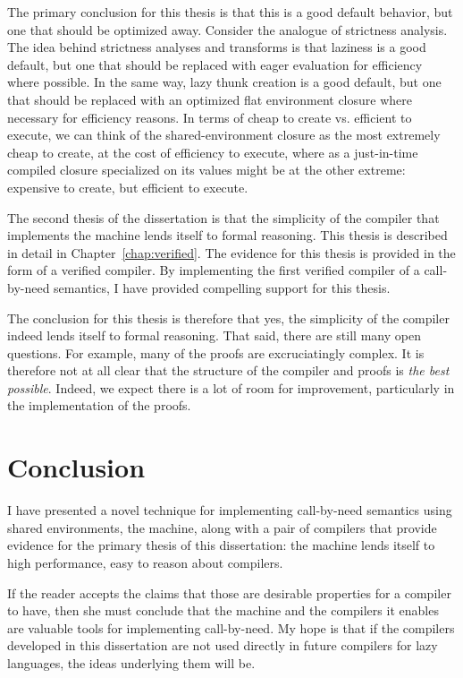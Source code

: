 The primary conclusion for this thesis is that this is a good default behavior,
but one that should be optimized away. Consider the analogue of strictness
analysis. The idea behind strictness analyses and transforms is that laziness is
a good default, but one that should be replaced with eager evaluation for
efficiency where possible. In the same way, lazy thunk creation is a good
default, but one that should be replaced with an optimized flat environment
closure where necessary for efficiency reasons. In terms of cheap to create vs. 
efficient to execute, we can think of the shared-environment closure as the most
extremely cheap to create, at the cost of efficiency to execute, where as a
just-in-time compiled closure specialized on its values might be at the other
extreme: expensive to create, but efficient to execute. 

The second thesis of the dissertation is that the simplicity of the compiler
that implements the \ce machine lends itself to formal reasoning. This thesis is
described in detail in Chapter~\ref{chap:verified}. The evidence for this thesis
is provided in the form of a verified compiler. By implementing the first
verified compiler of a call-by-need semantics, I have provided compelling
support for this thesis. 

The conclusion for this thesis is therefore that yes, the simplicity of the
compiler indeed lends itself to formal reasoning. That said, there are still
many open questions. For example, many of the proofs are excruciatingly complex.
It is therefore not at all clear that the structure of the compiler and proofs
is \emph{the best possible}. Indeed, we expect there is a lot of room for
improvement, particularly in the implementation of the proofs. 

\section{Conclusion}

I have presented a novel technique for implementing call-by-need semantics using
shared environments, the \ce machine, along with a pair of compilers that
provide evidence for the primary thesis of this dissertation: the \ce machine
lends itself to high performance, easy to reason about compilers. 

If the reader accepts the claims that those are desirable properties for a
compiler to have, then she must conclude that the \ce machine and the compilers
it enables are valuable tools for implementing call-by-need. My hope is that
if the compilers developed in this dissertation are not used directly in
future compilers for lazy languages, the ideas underlying them will be. 



